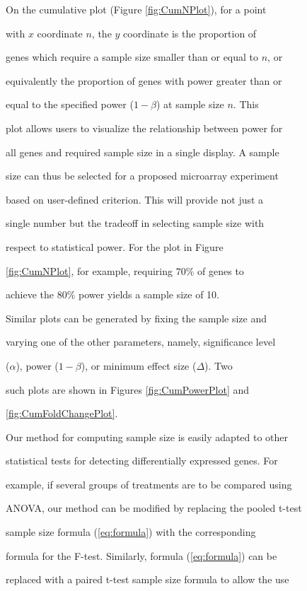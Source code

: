 \documentclass[12pt]{article}
\begin{document}
On the cumulative plot (Figure \ref{fig:CumNPlot}), for a point

with $x$ coordinate $n$, the $y$ coordinate is the proportion of

genes which require a sample size smaller than or equal to $n$, or

equivalently the proportion of genes with power greater than or

equal to the specified power ($1-\beta$) at sample size $n$. This

plot allows users to visualize the relationship between power for

all genes and required sample size in a single display.  A sample

size can thus be selected for a proposed microarray experiment

based on user-defined criterion.  This will provide not just a

single number but the tradeoff in selecting sample size with

respect to statistical power.  For the plot in Figure

\ref{fig:CumNPlot}, for example, requiring $70\%$ of genes to

achieve the $80\%$ power yields a sample size of 10.



Similar plots can be generated by fixing the sample size and

varying one of the other parameters, namely, significance level

($\alpha$), power ($1-\beta$), or minimum effect size ($\Delta$). Two

such plots are shown in Figures \ref{fig:CumPowerPlot} and

\ref{fig:CumFoldChangePlot}.



Our method for computing sample size is easily adapted to other

statistical tests for detecting differentially expressed genes. For

example, if several groups of treatments are to be compared using

ANOVA, our method can be modified by replacing the pooled t-test

sample size formula (\ref{eq:formula}) with the corresponding

formula for the F-test. Similarly, formula (\ref{eq:formula}) can be

replaced with a paired t-test sample size formula to allow the use
\end{document}
